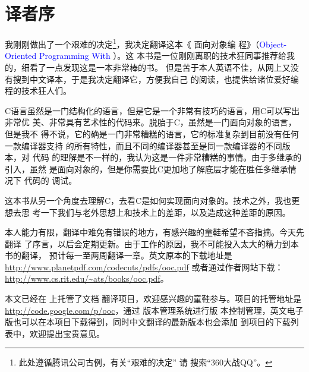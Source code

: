 


\chapter{译者序}
\label{ch:TransPreface}

我刚刚做出了一个艰难的决定\footnote{此处遵循腾讯公司古例，有关“艰难的决定”
请 \Google{} 搜索“360大战QQ”。}，我决定翻译这本《 面向对象编
程》（\textcolor{blue}{Object-Oriented Programming With }）。这
本书是一位刚刚离职的技术狂同事推荐给我的，细看了一点发现这是一本非常棒的书。
但是苦于本人英语不佳，从网上又没有搜到中文译本，于是我决定翻译它，方便我自己
的阅读，也提供给诸位爱好编程的技术狂人们。

C语言虽然是一门结构化的语言，但是它是一个非常有技巧的语言，用C可以写出非常优
美、非常具有艺术性的代码来。\cpp 脱胎于C，虽然是一门面向对象的语言，但是我不
得不说，它的确是一门非常糟糕的语言，它的标准复杂到目前没有任何一款编译器支持
\cpp 的所有特性，而且不同的编译器甚至是同一款编译器的不同版本，对 \cpp 代码
的理解是不一样的，我认为这是一件非常糟糕的事情。由于多继承的引入，虽然 \cpp
是面向对象的，但是你需要比C更加地了解底层才能在胜任多继承情况下 \cpp 代码的
调试。

这本书从另一个角度去理解C，去看C是如何实现面向对象的。技术之外，我也更想去思
考一下我们与老外思想上和技术上的差距，以及造成这种差距的原因。

\iffalse
本文通过\LaTeX{}进行排版，由于初次使用\LaTeX{}的Book模板，有些地方做的不
是很好敬请谅解～～
\fi %

本人能力有限，翻译中难免有错误的地方，有感兴趣的童鞋希望不吝指摘。今天先翻译
了序言，以后会定期更新。由于工作的原因，我不可能投入太大的精力到本书的翻译，
预计每一至两周翻译一章。英文原本的下载地址是
\url{http://www.planetpdf.com/codecuts/pdfs/ooc.pdf}
或者通过作者网站下载：\url{http://www.cs.rit.edu/~ats/books/ooc.pdf}。

本文已经在  上托管了文档
翻译项目，欢迎感兴趣的童鞋参与。项目的托管地址是
\url{http://code.google.com/p/ooc}，通过 版本管理系统进行版
本控制管理，英文电子版也可以在本项目下载得到，同时中文翻译的最新版本也会添加
到项目的下载列表中，欢迎提出宝贵意见。

